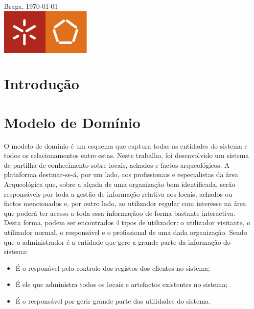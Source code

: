 \documentclass[12pt,a4paper]{article}
\begin{document}
\begin{titlepage}
Braga, {\large \today}\\[1cm] %


\includegraphics[scale=1]{escola_eng.png}\\[0cm] %
 

\vfill %

\end{titlepage}
\thispagestyle{empty}
\newpage

\tableofcontents
\newpage

\section{Introdução}


\newpage

\section{Modelo de Domínio}
O modelo de domínio é um esquema que captura todas as entidades do sistema e todos os relacionamentos entre estas. Neste trabalho, foi desenvolvido um sistema de partilha de conhecimento sobre locais, achados e factos arqueológicos. A plataforma destinar-se-á, por um lado, aos profissionais e especialistas da área Arqueológica que, sobre a alçada de uma organização bem identificada, serão responsáveis por toda a gestão de informação relativa aos locais, achados ou factos mencionados e, por outro lado, ao utilizador regular com interesse na área que poderá ter acesso a toda essa informaçãoo de forma bastante interactiva. Desta forma, podem ser encontrados 4 tipos de utilizador: o utilizador visitante, o utilizador normal, o responsável e o profissional de uma dada organização. Sendo que o administrador é a entidade que gere a grande parte da informação do sistema:\\
\begin{itemize}
\item É o responável pelo controlo dos registos dos clientes no sistema;
\item É ele que administra todos os locais e artefactos existentes no sistema;
\item É o responsável por gerir grande parte das utilidades do sistema.
\end{itemize}
\end{document}
